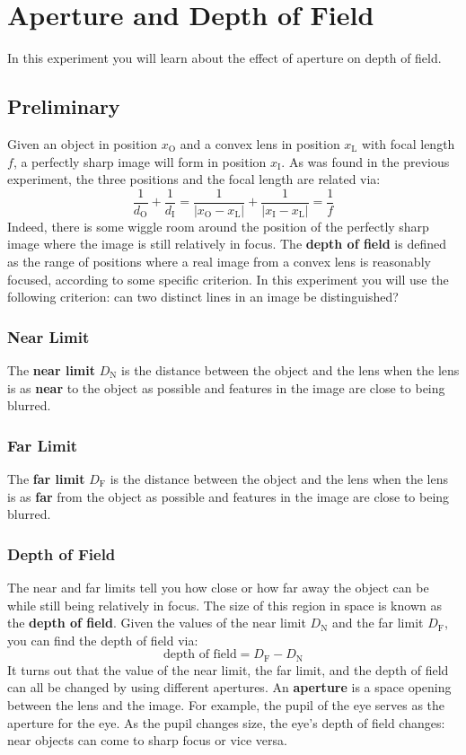 \setcounter{chapter}{7}
\chapter{Aperture and Depth of Field}
%
In this experiment you will learn about the effect of aperture on depth of field.
%
\section{Preliminary}
%
Given an object in position $x_{\text{O}}$ and a convex lens in position $x_{\text{L}}$ with focal length $f$, a perfectly sharp image will form in position $x_{\text{I}}$. As was found in the previous experiment, the three positions and the focal length are related via:
\begin{equation}
    \frac{1}{d_{\text{O}}} + \frac{1}{d_{\text{I}}} = \frac{1}{\vert x_{\text{O}} - x_{\text{L}} \vert} + \frac{1}{\vert x_{\text{I}} - x_{\text{L}} \vert} = \frac{1}{f}
\end{equation}
Indeed, there is some wiggle room around the position of the perfectly sharp image where the image is still relatively in focus. The \textbf{depth of field} is defined as the range of positions where a real image from a convex lens is reasonably focused, according to some specific criterion. In this experiment you will use the following criterion: can two distinct lines in an image be distinguished?
%
\subsection{Near Limit}
%
The \textbf{near limit} $D_{\text{N}}$ is the distance between the object and the lens when the lens is as \textbf{near} to the object as possible and features in the image are close to being blurred.
%
\subsection{Far Limit}
%
The \textbf{far limit} $D_{\text{F}}$ is the distance between the object and the lens when the lens is as \textbf{far} from the object as possible and features in the image are close to being blurred.
%
\subsection{Depth of Field}
%
The near and far limits tell you how close or how far away the object can be while still being relatively in focus. The size of this region in space is known as the \textbf{depth of field}. Given the values of the near limit $D_{\text{N}}$ and the far limit $D_\text{{F}}$, you can find the depth of field via:
\begin{equation}
    \text{depth of field} = D_{\text{F}} - D_{\text{N}}
    \label{eq.09.dof}
\end{equation}
It turns out that the value of the near limit, the far limit, and the depth of field can all be changed by using different apertures. An \textbf{aperture} is a space opening between the lens and the image. For example, the pupil of the eye serves as the aperture for the eye. As the pupil changes size, the eye's depth of field changes: near objects can come to sharp focus or vice versa.
%
